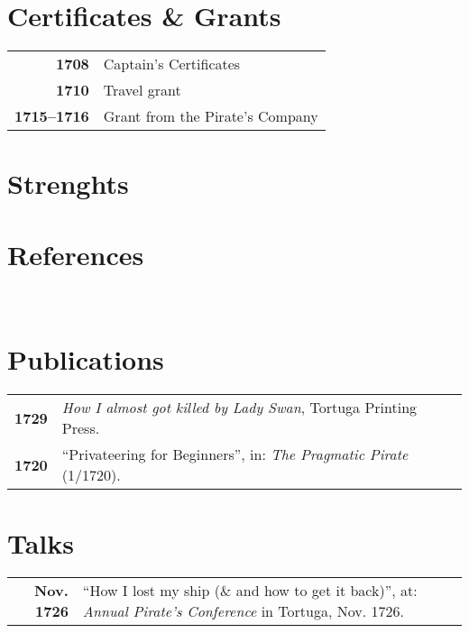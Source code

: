 \documentclass[lighthipster]{hipstercv}
\begin{document}
\begin{paracol}{2}
\vspace{4em}

\begin{minipage}[t]{0.3\textwidth}
\section*{Certificates \& Grants}
\begin{tabular}{>{\footnotesize\bfseries}r >{\footnotesize}p{}}
    1708 & Captain's Certificates \\
    1710 & Travel grant \\
    1715--1716 & Grant from the Pirate's Company
\end{tabular}
\bigskip

\section*{Strenghts}
\bigskip

\section*{References}
 \\

\end{minipage}\hfill
\begin{minipage}[t]{0.3\textwidth}
\section*{Publications}
\begin{tabular}{>{\footnotesize\bfseries}r >{\footnotesize}p{}}
    1729 & \emph{How I almost got killed by Lady Swan}, Tortuga Printing Press. \\
    1720 & ``Privateering for Beginners'', in: \emph{The Pragmatic Pirate} (1/1720).
\end{tabular}
\bigskip

\section*{Talks}
\begin{tabular}{>{\footnotesize\bfseries}r >{\footnotesize}p{}}
    Nov. 1726 & ``How I lost my ship (\& and how to get it back)'', at: \emph{Annual Pirate's Conference} in Tortuga, Nov. 1726.
\end{tabular}
\end{minipage}










\end{paracol}
\end{document}
